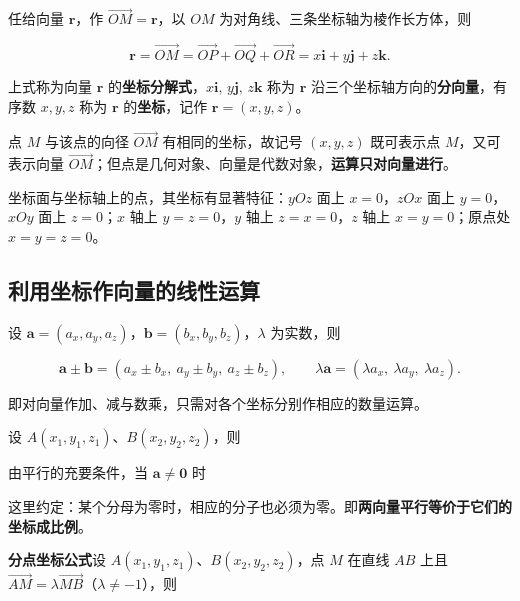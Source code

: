 任给向量 $\boldsymbol{r}$，作 $\overrightarrow{OM}=\boldsymbol{r}$，以 $OM$ 为对角线、三条坐标轴为棱作长方体，则

\[
\boldsymbol{r}=\overrightarrow{OM}=\overrightarrow{OP}+\overrightarrow{OQ}+\overrightarrow{OR}
=x\boldsymbol{i}+y\boldsymbol{j}+z\boldsymbol{k}.
\]

上式称为向量 $\boldsymbol{r}$ 的\textbf{坐标分解式}，$x\boldsymbol{i},\,y\boldsymbol{j},\,z\boldsymbol{k}$ 称为 $\boldsymbol{r}$ 沿三个坐标轴方向的\textbf{分向量}，有序数 $x,y,z$ 称为 $\boldsymbol{r}$ 的\textbf{坐标}，记作 $\boldsymbol{r}=(x,y,z)$。

点 $M$ 与该点的向径 $\overrightarrow{OM}$ 有相同的坐标，故记号 $(x,y,z)$ 既可表示点 $M$，又可表示向量 $\overrightarrow{OM}$；但点是几何对象、向量是代数对象，\textbf{运算只对向量进行}。

坐标面与坐标轴上的点，其坐标有显著特征：$yOz$ 面上 $x=0$，$zOx$ 面上 $y=0$，$xOy$ 面上 $z=0$；$x$ 轴上 $y=z=0$，$y$ 轴上 $z=x=0$，$z$ 轴上 $x=y=0$；原点处 $x=y=z=0$。

\subsection{利用坐标作向量的线性运算}

设 $\boldsymbol{a}=(a_x,a_y,a_z)$，$\boldsymbol{b}=(b_x,b_y,b_z)$，$\lambda$ 为实数，则

\[
\boldsymbol{a}\pm\boldsymbol{b}=(a_x\pm b_x,\ a_y\pm b_y,\ a_z\pm b_z),\qquad
\lambda\boldsymbol{a}=(\lambda a_x,\ \lambda a_y,\ \lambda a_z).
\]

即对向量作加、减与数乘，只需对各个坐标分别作相应的数量运算。

设 $A(x_1,y_1,z_1)$、$B(x_2,y_2,z_2)$，则


由平行的充要条件，当 $\boldsymbol{a}\neq\boldsymbol{0}$ 时


这里约定：某个分母为零时，相应的分子也必须为零。即\textbf{两向量平行等价于它们的坐标成比例}。

\textbf{分点坐标公式}\quad 设 $A(x_1,y_1,z_1)$、$B(x_2,y_2,z_2)$，点 $M$ 在直线 $AB$ 上且 $\overrightarrow{AM}=\lambda\overrightarrow{MB}$（$\lambda\neq-1$），则


